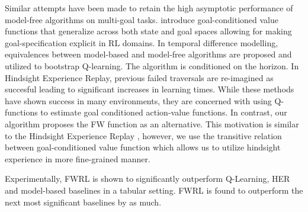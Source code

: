 Similar attempts have been made to retain the high asymptotic
performance of model-free algorithms on multi-goal tasks.
\citet{schaul2015universal} introduce goal-conditioned value functions
that generalize across both state and goal spaces allowing for
making goal-specification explicit in RL domains. In temporal difference
modelling, equivalences between model-based and model-free algorithms
are proposed and utilized to bootstrap Q-learning. The algorithm is
conditioned on the horizon. In Hindsight Experience Replay, previous
failed traversals are re-imagined as succesful leading to significant
increases in learning times. While these methods have shown success in
many environments, they are concerned with using Q-functions to estimate
goal conditioned action-value functions. In contrast, our algorithm
proposes the FW function as an alternative. This motivation is
similar to the Hindsight Experience Replay \cite{anderson2017vision}, however,
we use the transitive relation between goal-conditioned value function which
allows us to utilize hindsight experience in more fine-grained manner.

Experimentally, FWRL is shown to significantly outperform Q-Learning, HER and
model-based baselines in a tabular setting. FWRL is found to outperform the next
most significant baselines by as much.






